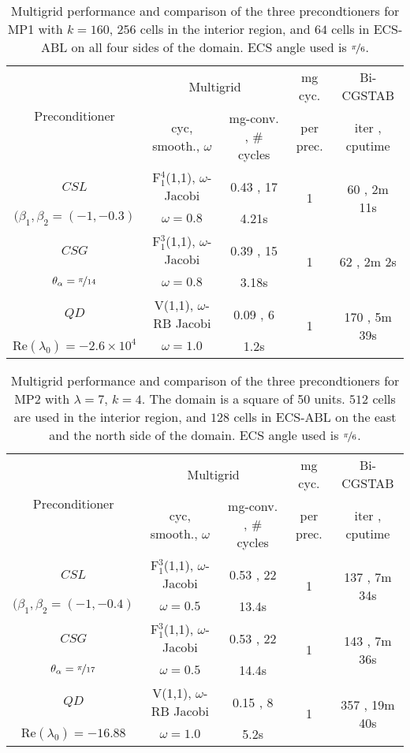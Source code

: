 \documentclass[mathpazo]{cicp}
\theoremstyle{definition}
\numberwithin{equation}{section}
\begin{document}
\begin{table}
 \begin{tabular}{|c|c|c|c|c|} \hline 
  \multirow{2}{*}{Preconditioner} & \multicolumn{2}{c|}{Multigrid} & mg cyc. & Bi-CGSTAB\\ \cline{2-3}
 & cyc, smooth., $\omega$ & mg-conv. , \# cycles & per prec. & iter , cputime \\ \hline
$CSL$ & F$_1^4$(1,1), $\omega$-Jacobi & 0.43 , 17 & \multirow{2}{*}{1} & \multirow{2}{*}{60 , 2m 11s}\\
$(\beta_1, \beta_2 = (-1, -0.3)$ & $\omega = 0.8$ & 4.21s & & \\ \hline
$CSG$ & F$_1^3$(1,1), $\omega$-Jacobi & 0.39 , 15 & \multirow{2}{*}{1} & \multirow{2}{*}{62 , 2m 2s}\\
$\theta_{\alpha} = \nicefrac{\pi}{14}$ & $\omega = 0.8$ & 3.18s & & \\ \hline
$QD$ & V(1,1), $\omega$-RB Jacobi & 0.09 , 6 & \multirow{2}{*}{1} & \multirow{2}{*}{170 , 5m 39s}\\
$\text{Re}(\lambda_0) = -2.6 \times 10^4$ & $\omega = 1.0$ & 1.2s & & \\ \hline
 \end{tabular}
\caption{Multigrid performance and comparison of the three precondtioners for MP1 with $k=160$, $256$ cells in the interior region, and $64$ cells in ECS-ABL on all four sides of the domain. ECS angle used is $\nicefrac{\pi}{6}$.}
\label{tab:exp1}
\end{table}

\begin{table}
 \begin{tabular}{|c|c|c|c|c|} \hline 
  \multirow{2}{*}{Preconditioner} & \multicolumn{2}{c|}{Multigrid} & mg cyc. & Bi-CGSTAB\\ \cline{2-3}
 & cyc, smooth., $\omega$ & mg-conv. , \# cycles & per prec. & iter , cputime \\ \hline
$CSL$ & F$_1^3$(1,1), $\omega$-Jacobi & 0.53 , 22 & \multirow{2}{*}{1} & \multirow{2}{*}{137 , 7m 34s}\\
$(\beta_1, \beta_2 = (-1, -0.4)$ & $\omega = 0.5$ & 13.4s & & \\ \hline
$CSG$ & F$_1^3$(1,1), $\omega$-Jacobi & 0.53 , 22 & \multirow{2}{*}{1} & \multirow{2}{*}{143 , 7m 36s}\\
$\theta_{\alpha} = \nicefrac{\pi}{17}$ & $\omega = 0.5$ & 14.4s & & \\ \hline
$QD$ & V(1,1), $\omega$-RB Jacobi & 0.15 , 8 & \multirow{2}{*}{1} & \multirow{2}{*}{357 , 19m 40s}\\
$\text{Re}(\lambda_0) = -16.88$ & $\omega = 1.0$ & 5.2s & & \\ \hline
 \end{tabular}
\caption{Multigrid performance and comparison of the three precondtioners for MP2 with $\lambda=7$, $k=4$. The domain is a square of 50 units. $512$ cells are used in the interior region, and $128$ cells in ECS-ABL on the east and the north side of the domain. ECS angle used is $\nicefrac{\pi}{6}$.}
\label{tab:exp2}
\end{table}
\end{document}
